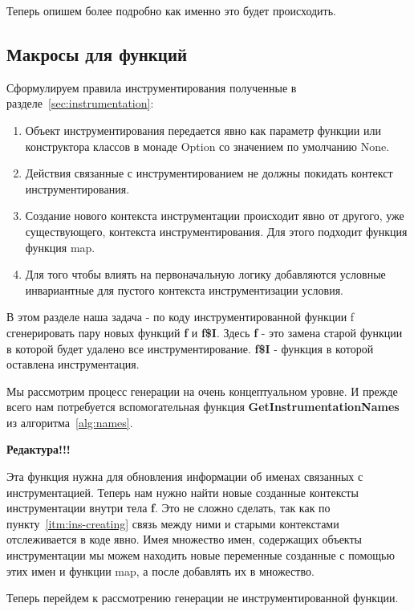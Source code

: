 Теперь опишем более подробно как именно это будет происходить.

\subsection{Макросы для функций}
\label{sec:macroFunction}

Сформулируем правила инструментирования полученные в
разделе~\ref{sec:instrumentation}:
\begin{enumerate}
  \item
  \label{itm:ins-constructor}
  Объект инструментирования передается явно как параметр функции или
  конструктора классов в монаде Option со значением по умолчанию None.
  \item
  \label{itm:ins-context}
  Действия связанные с инструментированием не должны покидать контекст
  инструментирования.
  \item
  \label{itm:ins-creating}
  Создание нового контекста инструментации происходит явно от другого,
  уже существующего, контекста инструментирования.
  Для этого подходит функция функция map.
  \item
  \label{itm:ins-logic}
  Для того чтобы влиять на первоначальную логику добавляются условные
  инвариантные для пустого контекста инструментизации условия.
\end{enumerate}


В этом разделе наша задача - по коду инструментированной функции f сгенерировать
пару новых функций \textbf{f} и \textbf{f\$I}.
Здесь \textbf{f} - это замена старой функции в которой будет удалено
все инструментирование.
\textbf{f\$I} - функция в которой оставлена инструментация.

Мы рассмотрим процесс генерации на очень концептуальном уровне.
И прежде всего нам потребуется вспомогательная функция
\textbf{GetInstrumentationNames} из алгоритма~\ref{alg:names}.

\textbf{Редактура!!!}

Эта функция нужна для обновления информации об именах связанных с инструментацией.
Теперь нам нужно найти новые созданные контексты инструментации внутри
тела \textbf{f}.
Это не сложно сделать, так как по пункту~\ref{itm:ins-creating} связь между ними
и старыми контекстами отслеживается в коде явно.
Имея множество имен, содержащих объекты инструментации мы можем находить новые
переменные созданные с помощью этих имен и функции map, а после добавлять их в
множество.

Теперь перейдем к рассмотрению генерации не инструментированной функции.


